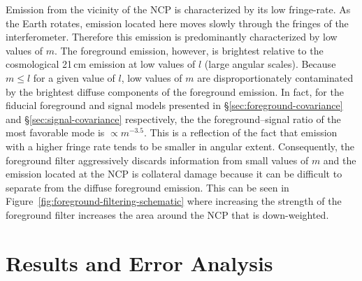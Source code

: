 \documentclass[twocolumn]{aastex62}
\newcommand{\todo}[1]{\PackageWarning{TODO:}{#1!}}
\begin{document}
Emission from the vicinity of the NCP is characterized by its low fringe-rate. As the Earth rotates,
emission located here moves slowly through the fringes of the interferometer. Therefore this
emission is predominantly characterized by low values of $m$. The foreground emission, however, is
brightest relative to the cosmological 21\,cm emission at low values of $l$ (large angular scales).
Because $m \le l$ for a given value of $l$, low values of $m$ are disproportionately contaminated by
the brightest diffuse components of the foreground emission. In fact, for the fiducial foreground
and signal models presented in \S\ref{sec:foreground-covariance} and \S\ref{sec:signal-covariance}
respectively, the the foreground--signal ratio of the most favorable mode is $\propto m^{-3.5}$.
This is a reflection of the fact that emission with a higher fringe rate tends to be smaller in
angular extent.  Consequently, the foreground filter aggressively discards information from small
values of $m$ and the emission located at the NCP is collateral damage because it can be difficult
to separate from the diffuse foreground emission. This can be seen in
Figure~\ref{fig:foreground-filtering-schematic} where increasing the strength of the foreground
filter increases the area around the NCP that is down-weighted.


\section{Results and Error Analysis}\label{sec:results}
\end{document}

